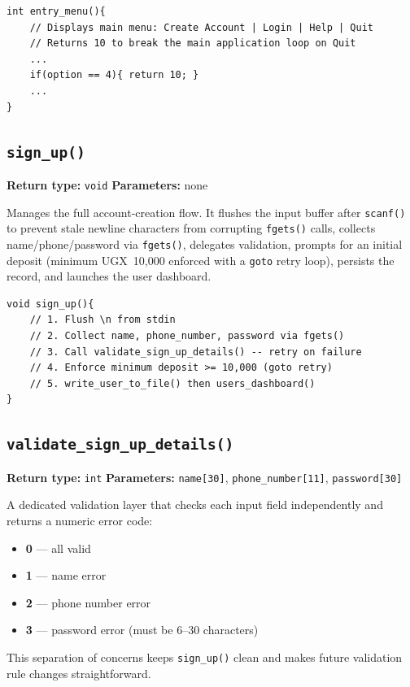 \documentclass[12pt, a4paper]{article}
\begin{document}
\begin{lstlisting}[caption={Skeleton of \texttt{entry\_menu()}}]
int entry_menu(){
    // Displays main menu: Create Account | Login | Help | Quit
    // Returns 10 to break the main application loop on Quit
    ...
    if(option == 4){ return 10; }
    ...
}
\end{lstlisting}

\subsection{\texttt{sign\_up()}}

\textbf{Return type:} \texttt{void} \quad \textbf{Parameters:} none

Manages the full account-creation flow. It flushes the input buffer after \texttt{scanf()} to
prevent stale newline characters from corrupting \texttt{fgets()} calls, collects
name/phone/password via \texttt{fgets()}, delegates validation, prompts for an initial
deposit (minimum UGX~10{,}000 enforced with a \texttt{goto} retry loop), persists the
record, and launches the user dashboard.

\begin{lstlisting}[caption={Pseudocode outline of \texttt{sign\_up()}}]
void sign_up(){
    // 1. Flush \n from stdin
    // 2. Collect name, phone_number, password via fgets()
    // 3. Call validate_sign_up_details() -- retry on failure
    // 4. Enforce minimum deposit >= 10,000 (goto retry)
    // 5. write_user_to_file() then users_dashboard()
}
\end{lstlisting}

\subsection{\texttt{validate\_sign\_up\_details()}}

\textbf{Return type:} \texttt{int} \quad
\textbf{Parameters:} \texttt{name[30]}, \texttt{phone\_number[11]}, \texttt{password[30]}

A dedicated validation layer that checks each input field independently and returns a
numeric error code:
\begin{itemize}
    \item \textbf{0} — all valid
    \item \textbf{1} — name error
    \item \textbf{2} — phone number error
    \item \textbf{3} — password error (must be 6–30 characters)
\end{itemize}
This separation of concerns keeps \texttt{sign\_up()} clean and makes future validation
rule changes straightforward.
\end{document}
